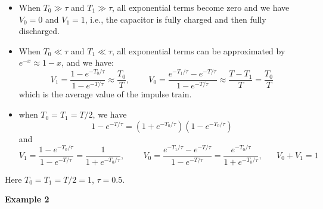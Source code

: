 \documentclass{article}
\begin{document}
\begin{itemize}
\item When $T_0\gg\tau$ and $T_1\gg\tau$, all exponential terms become zero 
  and we have $V_0=0$ and $V_1=1$, i.e., the capacitor is fully charged and
  then fully discharged.
\item When $T_0\ll\tau$ and $T_1\ll\tau$, all exponential terms can be 
  approximated by $e^{-x}\approx 1-x$, and we have:
  \begin{equation}
    V_1=\frac{1-e^{-T_0/\tau}}{1-e^{-T/\tau}}\approx\frac{T_0}{T},  \;\;\;\;\;\;\;\;
    V_0=\frac{e^{-T_1/\tau}-e^{-T/\tau}}{1-e^{-T/\tau}}\approx\frac{T-T_1}{T}=\frac{T_0}{T} 
  \end{equation}
  which is the average value of the impulse train.

\item when $T_0=T_1=T/2$, we have
  \begin{equation} 
    1-e^{-T/\tau}=(1+e^{-T_0/\tau})(1-e^{-T_0/\tau}) 
  \end{equation}
  and
  \begin{equation} 
    V_1=\frac{1-e^{-T_0/\tau}}{1-e^{-T/\tau}}=\frac{1}{1+e^{-T_0/\tau}},
    \;\;\;\;\;\;\;\;
    V_0=\frac{e^{-T_1/\tau}-e^{-T/\tau}}{1-e^{-T/\tau}}=\frac{e^{-T_0/\tau}}{1+e^{-T_0/\tau}},
    \;\;\;\;\;\;V_0+V_1=1 
  \end{equation}
\end{itemize}


Here $T_0=T_1=T/2=1$, $\tau=0.5$.


{\bf Example 2} 
\end{document}
